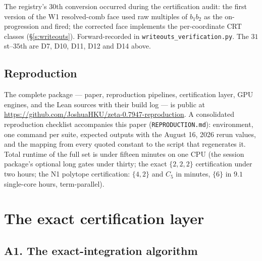 \documentclass[11pt]{article}
\numberwithin{equation}{section}
\theoremstyle{definition}
\theoremstyle{remark}
\begin{document}
\noindent The registry's $30$th conversion occurred during the
certification audit: the first version of the W1 resolved-comb
face
used raw multiples of $b_1b_2$ as the on-progression and fired;
the corrected face implements the per-coordinate CRT classes
(\S\ref{s:writeouts}). Forward-recorded in
\texttt{writeouts\_verification.py}. The $31$st--$35$th are
D7, D10, D11, D12 and D14 above.

\subsection*{Reproduction}

The complete package --- paper, reproduction pipelines,
certification layer, GPU engines, and the Lean sources with their
build log --- is public at
\url{https://github.com/JoshuaHKU/zeta-0.7947-reproduction}.
A consolidated reproduction checklist accompanies this paper
(\texttt{REPRODUCTION.md}): environment, one command per suite,
expected outputs with the August 16, 2026 rerun values, and the
mapping from every quoted constant to the script that regenerates
it. Total runtime of the full set is under fifteen minutes on one
CPU (the session package's optional long gates under thirty; the
exact $\{2,2,2\}$ certification under two hours; the N1
polytope certification: $\{4,2\}$ and $C_5$ in minutes,
$\{6\}$ in $9.1$ single-core hours, term-parallel).

\section{The exact certification layer}\label{a:cert}

\subsection*{A1. The exact-integration algorithm}
\end{document}
